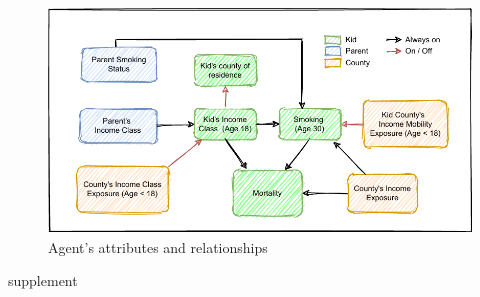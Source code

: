 \documentclass[class=article, crop=false, 12pt]{standalone}
\begin{document}
\newpage


\newpage
\begin{figure}[htp]
    \centering
    \caption{Agent's attributes and relationships}
    \label{ch04:agent_relationships}
        \includegraphics[scale=1.1]{plots/abm-mobility-simplified.pdf}
\end{figure}

\newpage


\newpage


\newpage


\onlyifstandalone{
\newpage
\setlength\bibitemsep{5pt}
\printbibliography[heading = subbibliography, title={References}]
\end{refsection}
}


\clearpage
{supplement}

\end{document}
